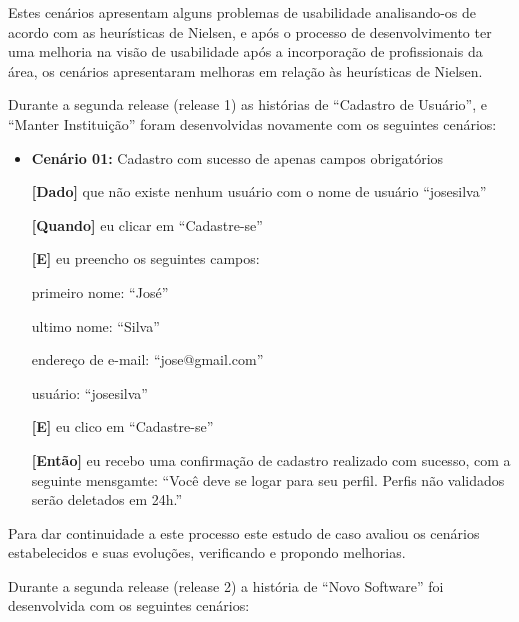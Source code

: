 Estes cenários apresentam alguns problemas de usabilidade analisando-os de acordo com as heurísticas de Nielsen, e após o processo de desenvolvimento ter uma melhoria na visão de usabilidade após a incorporação de profissionais da área, os cenários apresentaram melhoras em relação às heurísticas de Nielsen. 

Durante a segunda release (release 1) as histórias de ``Cadastro de Usuário'', e ``Manter Instituição'' foram desenvolvidas novamente com os seguintes cenários:

\begin{itemize}
\item\textbf{Cenário 01:} Cadastro com sucesso de apenas campos obrigatórios

	\textbf{[Dado]} que não existe nenhum usuário com o nome de usuário ``josesilva''

	\textbf{[Quando]} eu clicar em ``Cadastre-se''

	\textbf{[E]} eu preencho os seguintes campos: 

  		\subitem primeiro nome: ``José''

  		\subitem ultimo nome: ``Silva''

  		\subitem endereço de e-mail: ``jose@gmail.com''

  		\subitem usuário: ``josesilva''
  		
	\textbf{[E]} eu clico em ``Cadastre-se''

	\textbf{[Então]} eu recebo uma confirmação de cadastro realizado com sucesso, com a seguinte mensgamte: 
	``Você deve se logar para seu perfil. Perfis não validados serão deletados em 24h.''
\end{itemize}

Para dar continuidade a este processo este estudo de caso avaliou os cenários estabelecidos e suas evoluções, verificando e propondo melhorias.

Durante a segunda release (release 2) a história de ``Novo Software'' foi desenvolvida com os seguintes cenários:

